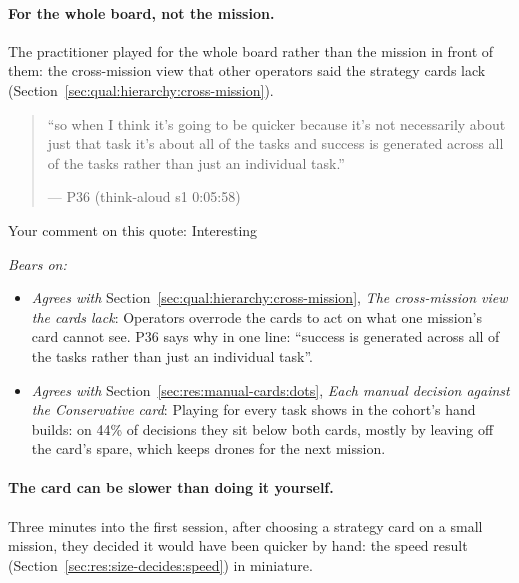 
\label{sec:qual:practitioner:pt-whole-board}\paragraph{For the whole board, not the mission.}
The practitioner played for the whole board rather than the mission in front of them: the cross-mission view that other operators said the strategy cards lack (Section~\ref{sec:qual:hierarchy:cross-mission}).

\begin{quote}\small
``so when I think it's going to be quicker because it's not necessarily about just that task it's about all of the tasks and success is generated across all of the tasks rather than just an individual task.''\par\hfill--- P36 (think-aloud s1 0:05:58)
\end{quote}
\begin{options}
\noindent Your comment on this quote: Interesting
\end{options}

\noindent\textit{Bears on:}
\begin{itemize}[leftmargin=1.2em,itemsep=1pt]\small
\item \textit{Agrees with} Section~\ref{sec:qual:hierarchy:cross-mission}, \emph{The cross-mission view the cards lack}: Operators overrode the cards to act on what one mission's card cannot see. P36 says why in one line: ``success is generated across all of the tasks rather than just an individual task''.
\item \textit{Agrees with} Section~\ref{sec:res:manual-cards:dots}, \emph{Each manual decision against the Conservative card}: Playing for every task shows in the cohort's hand builds: on 44\% of decisions they sit below both cards, mostly by leaving off the card's spare, which keeps drones for the next mission.
\end{itemize}


\label{sec:qual:practitioner:pt-quicker-by-hand}\paragraph{The card can be slower than doing it yourself.}
Three minutes into the first session, after choosing a strategy card on a small mission, they decided it would have been quicker by hand: the speed result (Section~\ref{sec:res:size-decides:speed}) in miniature.

